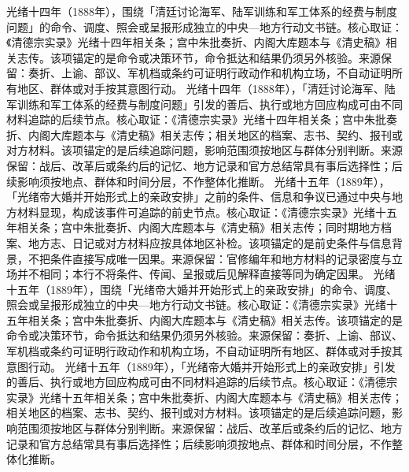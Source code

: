 光绪十四年（1888年），围绕「清廷讨论海军、陆军训练和军工体系的经费与制度问题」的命令、调度、照会或呈报形成独立的中央—地方行动文书链。核心取证：《清德宗实录》光绪十四年相关条；宫中朱批奏折、内阁大库题本与《清史稿》相关志传。该项锚定的是命令或决策环节，命令抵达和结果仍须另外核验。来源保留：奏折、上谕、部议、军机档或条约可证明行政动作和机构立场，不自动证明所有地区、群体或对手按其意图行动。
光绪十四年（1888年），「清廷讨论海军、陆军训练和军工体系的经费与制度问题」引发的善后、执行或地方回应构成可由不同材料追踪的后续节点。核心取证：《清德宗实录》光绪十四年相关条；宫中朱批奏折、内阁大库题本与《清史稿》相关志传；相关地区的档案、志书、契约、报刊或对方材料。该项锚定的是后续追踪问题，影响范围须按地区与群体分别判断。来源保留：战后、改革后或条约后的记忆、地方记录和官方总结常具有事后选择性；后续影响须按地点、群体和时间分层，不作整体化推断。
光绪十五年（1889年），「光绪帝大婚并开始形式上的亲政安排」之前的条件、信息和争议已通过中央与地方材料显现，构成该事件可追踪的前史节点。核心取证：《清德宗实录》光绪十五年相关条；宫中朱批奏折、内阁大库题本与《清史稿》相关志传；同时期地方档案、地方志、日记或对方材料应按具体地区补检。该项锚定的是前史条件与信息背景，不把条件直接写成唯一因果。来源保留：官修编年和地方材料的记录密度与立场并不相同；本行不将条件、传闻、呈报或后见解释直接等同为确定因果。
光绪十五年（1889年），围绕「光绪帝大婚并开始形式上的亲政安排」的命令、调度、照会或呈报形成独立的中央—地方行动文书链。核心取证：《清德宗实录》光绪十五年相关条；宫中朱批奏折、内阁大库题本与《清史稿》相关志传。该项锚定的是命令或决策环节，命令抵达和结果仍须另外核验。来源保留：奏折、上谕、部议、军机档或条约可证明行政动作和机构立场，不自动证明所有地区、群体或对手按其意图行动。
光绪十五年（1889年），「光绪帝大婚并开始形式上的亲政安排」引发的善后、执行或地方回应构成可由不同材料追踪的后续节点。核心取证：《清德宗实录》光绪十五年相关条；宫中朱批奏折、内阁大库题本与《清史稿》相关志传；相关地区的档案、志书、契约、报刊或对方材料。该项锚定的是后续追踪问题，影响范围须按地区与群体分别判断。来源保留：战后、改革后或条约后的记忆、地方记录和官方总结常具有事后选择性；后续影响须按地点、群体和时间分层，不作整体化推断。
